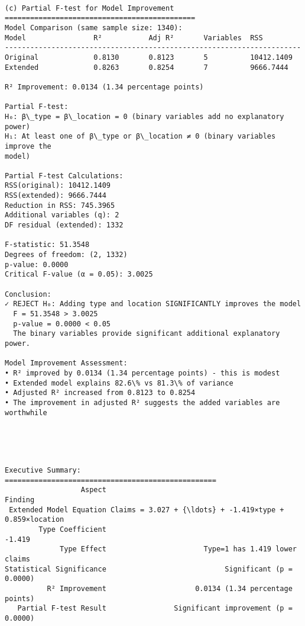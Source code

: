\documentclass[8pt, twocolumn]{extarticle}
\begin{document}
    \begin{Verbatim}[commandchars=\\\{\}]

(c) Partial F-test for Model Improvement
=============================================
Model Comparison (same sample size: 1340):
Model                R²           Adj R²       Variables  RSS
----------------------------------------------------------------------
Original             0.8130       0.8123       5          10412.1409
Extended             0.8263       0.8254       7          9666.7444

R² Improvement: 0.0134 (1.34 percentage points)

Partial F-test:
H₀: β\_type = β\_location = 0 (binary variables add no explanatory power)
H₁: At least one of β\_type or β\_location ≠ 0 (binary variables improve the
model)

Partial F-test Calculations:
RSS(original): 10412.1409
RSS(extended): 9666.7444
Reduction in RSS: 745.3965
Additional variables (q): 2
DF residual (extended): 1332

F-statistic: 51.3548
Degrees of freedom: (2, 1332)
p-value: 0.0000
Critical F-value (α = 0.05): 3.0025

Conclusion:
✓ REJECT H₀: Adding type and location SIGNIFICANTLY improves the model
  F = 51.3548 > 3.0025
  p-value = 0.0000 < 0.05
  The binary variables provide significant additional explanatory power.

Model Improvement Assessment:
• R² improved by 0.0134 (1.34 percentage points) - this is modest
• Extended model explains 82.6\% vs 81.3\% of variance
• Adjusted R² increased from 0.8123 to 0.8254
• The improvement in adjusted R² suggests the added variables are worthwhile
    \end{Verbatim}

    \begin{center}
    \end{center}
    { \hspace*{\fill} \\}
    
    \begin{Verbatim}[commandchars=\\\{\}]


Executive Summary:
==================================================
                  Aspect                                             Finding
 Extended Model Equation Claims = 3.027 + {\ldots} + -1.419×type + 0.859×location
        Type Coefficient                                              -1.419
             Type Effect                       Type=1 has 1.419 lower claims
Statistical Significance                            Significant (p = 0.0000)
          R² Improvement                     0.0134 (1.34 percentage points)
   Partial F-test Result                Significant improvement (p = 0.0000)
    \end{Verbatim}
\end{document}

